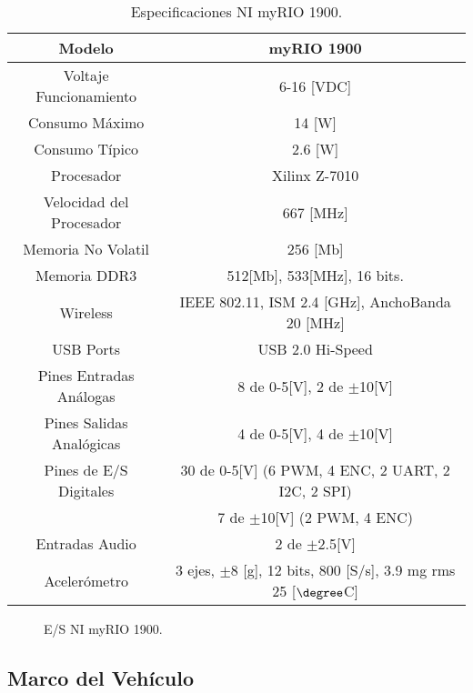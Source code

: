 \documentclass[../main.tex]{subfiles}
\begin{document}
\begin{table}[H]
\noindent \begin{centering}
\begin{tabular}{|c|c|}
\hline 
Modelo & myRIO 1900\tabularnewline
\hline 
\hline 
Voltaje Funcionamiento & 6-16 {[}VDC{]}\tabularnewline
\hline 
Consumo Máximo & 14 {[}W{]}\tabularnewline
\hline 
Consumo Típico & 2.6 {[}W{]}\tabularnewline
\hline 
Procesador & Xilinx Z-7010\tabularnewline
\hline 
Velocidad del Procesador & 667 {[}MHz{]}\tabularnewline
\hline 
Memoria No Volatil & 256 {[}Mb{]}\tabularnewline
\hline 
Memoria DDR3 & 512{[}Mb{]}, 533{[}MHz{]}, 16 bits.\tabularnewline
\hline 
Wireless & IEEE 802.11, ISM 2.4 {[}GHz{]}, AnchoBanda 20 {[}MHz{]}\tabularnewline
\hline 
USB Ports & USB 2.0 Hi-Speed\tabularnewline
\hline 
Pines Entradas Análogas  & 8 de 0-5{[}V{]}, 2 de $\pm$10{[}V{]}\tabularnewline
\hline 
Pines Salidas Analógicas  & 4 de 0-5{[}V{]}, 4 de $\pm$10{[}V{]}\tabularnewline
\hline 
Pines de E/S Digitales & 30 de 0-5{[}V{]} (6 PWM, 4 ENC, 2 UART, 2 I2C, 2 SPI)\tabularnewline
 & 7 de $\pm$10{[}V{]} (2 PWM, 4 ENC)\tabularnewline
\hline 
Entradas Audio & 2 de $\pm$2.5{[}V{]}\tabularnewline
\hline 
Acelerómetro & 3 ejes, $\pm$8 {[}g{]}, 12 bits, 800 {[}S/s{]}, 3.9 mg rms 25 [$\degree$C]\tabularnewline
\hline 
\end{tabular}
\par\end{centering}
\caption{Especificaciones NI myRIO 1900.}
\end{table}

\textcompwordmark{}

\begin{figure}[H]
\noindent \begin{centering}
\par\end{centering}
\caption{E/S NI myRIO 1900.}
\end{figure}


\subsection{Marco del Vehículo}
\end{document}

